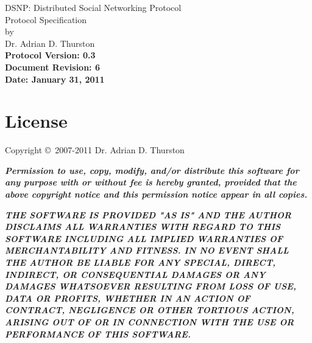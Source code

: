 \documentclass[letterpaper,11pt,oneside]{article}
\begin{document}
%
%

\thispagestyle{empty}
\begin{center}
{\huge DSNP: Distributed Social Networking Protocol}\\
\vspace*{12pt}
{\Large Protocol Specification}\\
\vspace{12pt}
by\\
\vspace{12pt}
{\large Dr. Adrian D. Thurston}\\
\vspace{22pt}
{\noindent\bf\large Protocol Version: 0.3}\\
\vspace{6pt}
{\noindent\bf\large Document Revision: 6}\\
\vspace{6pt}
{\noindent\bf\large Date: January 31, 2011}
\end{center}


\vspace{1.3in}

\section*{License}

Copyright \copyright\ 2007-2011 Dr. Adrian D. Thurston

\vspace{5pt}

{\bf\it\noindent Permission to use, copy, modify, and/or distribute this
software for any purpose with or without fee is hereby granted, provided that
the above copyright notice and this permission notice appear in all copies.}

\vspace{5pt}

{\bf\it\noindent
THE SOFTWARE IS PROVIDED "AS IS" AND THE AUTHOR DISCLAIMS ALL WARRANTIES
WITH REGARD TO THIS SOFTWARE INCLUDING ALL IMPLIED WARRANTIES OF
MERCHANTABILITY AND FITNESS. IN NO EVENT SHALL THE AUTHOR BE LIABLE FOR
ANY SPECIAL, DIRECT, INDIRECT, OR CONSEQUENTIAL DAMAGES OR ANY DAMAGES
WHATSOEVER RESULTING FROM LOSS OF USE, DATA OR PROFITS, WHETHER IN AN
ACTION OF CONTRACT, NEGLIGENCE OR OTHER TORTIOUS ACTION, ARISING OUT OF
OR IN CONNECTION WITH THE USE OR PERFORMANCE OF THIS SOFTWARE.}

\vspace{1.5in}
\end{document}
